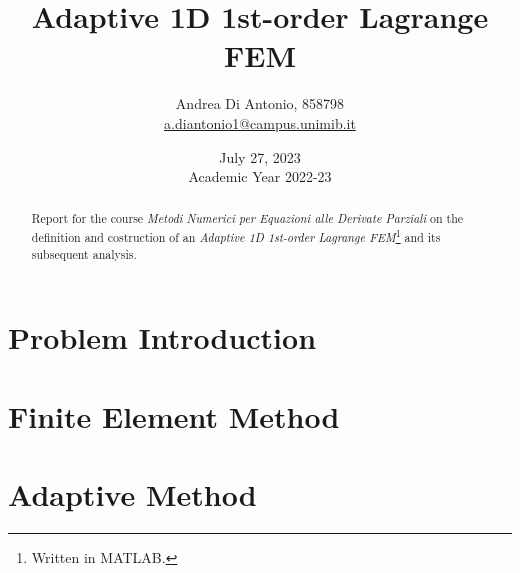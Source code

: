 \documentclass[12pt]{article}
\title{Adaptive 1D 1st-order Lagrange FEM}
\author{Andrea Di Antonio, 858798 \\ \hyperlink{mailto:a.diantonio1@campus.unimib.it}{a.diantonio1@campus.unimib.it}}
\date{July 27, 2023 \\ Academic Year 2022-23}
\begin{document}
	\maketitle
	\thispagestyle{fancy}
	
	\begin{abstract}
		\begin{center}
            Report for the course \textit{Metodi Numerici per Equazioni alle Derivate Parziali} on the definition and costruction of an \textit{Adaptive 1D 1st-order Lagrange FEM}\footnote{Written in MATLAB.} and its subsequent analysis.
        \end{center}
	\end{abstract}

    \tableofcontents

    \newpage
    \section{Problem Introduction}
    

    \newpage
    \section{Finite Element Method}

    \newpage
    \section{Adaptive Method}
\end{document}
